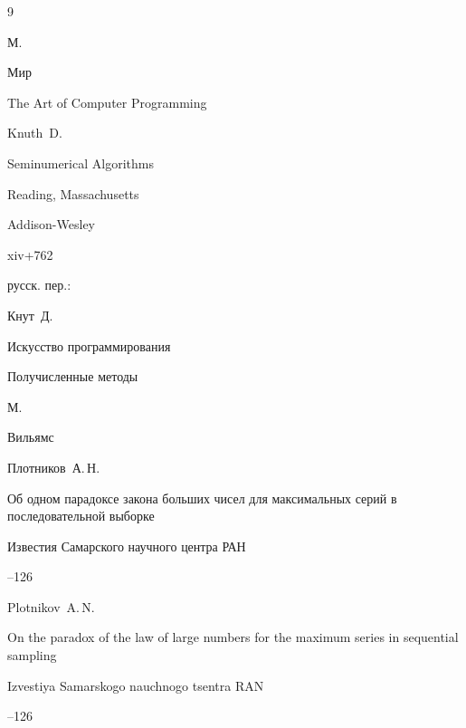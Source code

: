 \begin{thebibliography}{9}

\publaddr М.

\publ Мир






\book The Art of Computer Programming 

\by Knuth~D.


\volinfo Seminumerical Algorithms 

\publaddr Reading, Massachusetts

\publ Addison-Wesley


\totalpages xiv+762

\rtransl русск. пер.:~

\by Кнут~Д.

\book Искусство программирования


\volinfo Получисленные методы

\publaddr М.

\publ Вильямс






\by Плотников~А.\,Н.

\paper Об одном парадоксе закона больших чисел для максимальных серий в последовательной выборке

\jour Известия Самарского научного центра РАН




--126

\misctransl

\by Plotnikov~A.\,N.

\paper On the paradox of the law of large numbers for the maximum series in sequential sampling

\jour Izvestiya Samarskogo nauchnogo tsentra RAN 




--126






\end{thebibliography}
